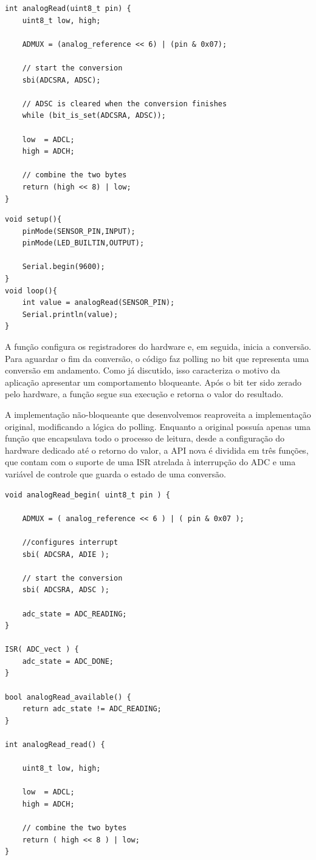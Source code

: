 \documentclass[11pt]{article}
\begin{document}
\begin{lstlisting}[style=CStyle,label=analogblock,caption=Leitura analógica bloqueante]
int analogRead(uint8_t pin) {
	uint8_t low, high;

	ADMUX = (analog_reference << 6) | (pin & 0x07);

	// start the conversion
	sbi(ADCSRA, ADSC);

	// ADSC is cleared when the conversion finishes
	while (bit_is_set(ADCSRA, ADSC));

	low  = ADCL;
	high = ADCH;

	// combine the two bytes
	return (high << 8) | low;
}
\end{lstlisting}
\begin{lstlisting}[style=CStyle,label=analogblockapp,caption=Aplicação utilizando driver bloqueante]
void setup(){
    pinMode(SENSOR_PIN,INPUT);
    pinMode(LED_BUILTIN,OUTPUT);

    Serial.begin(9600);
}
void loop(){
    int value = analogRead(SENSOR_PIN);
    Serial.println(value);
}
\end{lstlisting}
\par A função configura os registradores do hardware e, em seguida, inicia a conversão. Para aguardar o fim da conversão, o código faz polling no bit que representa uma conversão em andamento. Como já discutido, isso caracteriza o motivo da aplicação apresentar um comportamento bloqueante. Após o bit ter sido zerado pelo hardware, a função segue sua execução e retorna o valor do resultado. 
\par A implementação não-bloqueante que desenvolvemos reaproveita a implementação original, modificando a lógica do polling. Enquanto a original possuía apenas uma função que encapsulava todo o processo de leitura, desde a configuração do hardware dedicado até o retorno do valor, a API nova é dividida em três funções, que contam com o suporte de uma ISR atrelada à interrupção do ADC e uma variável de controle que guarda o estado de uma conversão.
\begin{lstlisting}[style=CStyle,label=analognonblock,caption=Leitura analógica não-bloqueante]
void analogRead_begin( uint8_t pin ) {

	ADMUX = ( analog_reference << 6 ) | ( pin & 0x07 );

	//configures interrupt
	sbi( ADCSRA, ADIE );

	// start the conversion
	sbi( ADCSRA, ADSC );

	adc_state = ADC_READING;
}

ISR( ADC_vect ) {
	adc_state = ADC_DONE;
}

bool analogRead_available() {
	return adc_state != ADC_READING;
}

int analogRead_read() {

	uint8_t low, high;

	low  = ADCL;
	high = ADCH;

	// combine the two bytes
	return ( high << 8 ) | low;
}
\end{lstlisting}
\end{document}
